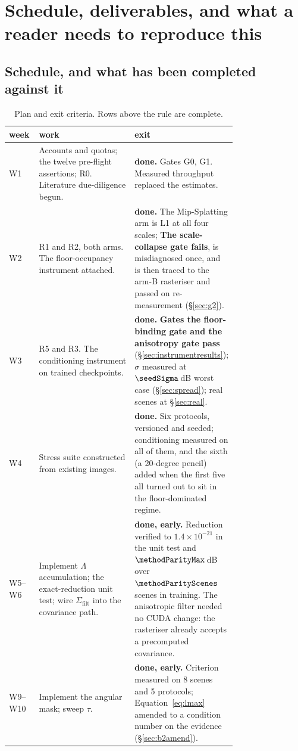 \chapter{Schedule, deliverables, and what a reader needs to reproduce this}
\label{ch:plan}

\section{Schedule, and what has been completed against it}
\begin{table}[htbp]
  \centering
  \caption{Plan and exit criteria. Rows above the rule are complete.}
  \label{tab:schedule}
  \small
  \begin{tabular}{lp{0.42\linewidth}p{0.34\linewidth}}
    \toprule
    week & work & exit \\
    \midrule
    W1 & Accounts and quotas; the twelve pre-flight assertions; R0. Literature due-diligence begun. & \textbf{done.} Gates G0, G1. Measured throughput replaced the estimates. \\
    W2 & R1 and R2, both arms. The floor-occupancy instrument attached. & \textbf{done.} The Mip-Splatting arm is L1 at all four scales; \textbf{The scale-collapse gate fails}, is misdiagnosed once, and is then traced to the arm-B rasteriser and passed on re-measurement (\S\ref{sec:g2}). \\
    W3 & R5 and R3. The conditioning instrument on trained checkpoints. & \textbf{done.} \textbf{Gates the floor-binding gate and the anisotropy gate pass} (\S\ref{sec:instrumentresults}); $\sigma$ measured at $\seedSigma$\,dB worst case (\S\ref{sec:spread}); real scenes at \S\ref{sec:real}. \\
    W4 & Stress suite constructed from existing images. & \textbf{done.} Six protocols, versioned and seeded; conditioning measured on all of them, and the sixth (a 20-degree pencil) added when the first five all turned out to sit in the floor-dominated regime. \\
    \midrule
    W5--W6 & Implement $\Lambda$ accumulation; the exact-reduction unit test; wire $\Sigma_{\mathrm{filt}}$ into the covariance path. & \textbf{done, early.} Reduction verified to $1.4\times10^{-21}$ in the unit test and $\methodParityMax$\,dB over $\methodParityScenes$ scenes in training. The anisotropic filter needed no CUDA change: the rasteriser already accepts a precomputed covariance. \\
    W9--W10 & Implement the angular mask; sweep $\tau$. & \textbf{done, early.} Criterion measured on 8 scenes and 5 protocols; Equation~\eqref{eq:lmax} amended to a condition number on the evidence (\S\ref{sec:b2amend}). \\

\end{tabular}
\end{table}
